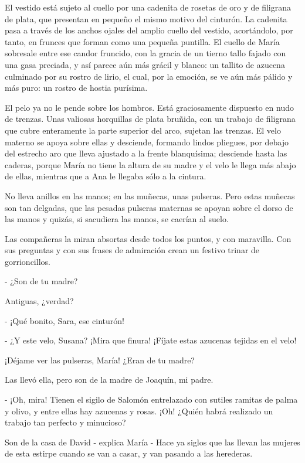 \documentclass[12pt]{book} %
\begin{document}
El vestido está sujeto al cuello por una cadenita de rosetas de oro y de filigrana de plata, que presentan en pequeño el mismo motivo del cinturón. La cadenita pasa a través de los anchos ojales del amplio cuello del vestido, acortándolo, por tanto, en frunces que forman como una pequeña puntilla. El cuello de María sobresale entre ese candor fruncido, con la gracia de un tierno tallo fajado con una gasa preciada, y así parece aún más grácil y blanco: un tallito de azucena culminado por su rostro de lirio, el cual, por la emoción, se ve aún más pálido y más puro: un rostro de hostia purísima. 

El pelo ya no le pende sobre los hombros. Está graciosamente dispuesto en nudo de trenzas. Unas valiosas horquillas de plata bruñida, con un trabajo de filigrana que cubre enteramente la parte superior del arco, sujetan las trenzas. El velo materno se apoya sobre ellas y desciende, formando lindos pliegues, por debajo del estrecho aro que lleva ajustado a la frente blanquísima; desciende hasta las caderas, porque María no tiene la altura de su madre y el velo le llega más abajo de ellas, mientras que a Ana le llegaba sólo a la cintura. 

No lleva anillos en las manos; en las muñecas, unas pulseras. Pero estas muñecas son tan delgadas, que las pesadas pulseras maternas se apoyan sobre el dorso de las manos y quizás, si sacudiera las manos, se caerían al suelo. 

Las compañeras la miran absortas desde todos los puntos, y con maravilla. Con sus preguntas y con sus frases de admiración crean un festivo trinar de gorrioncillos. 

- ¿Son de tu madre? 

Antiguas, ¿verdad? 

- ¡Qué bonito, Sara, ese cinturón! 

- ¿Y este velo, Susana? ¡Mira que finura! ¡Fíjate estas azucenas tejidas en el velo! 

¡Déjame ver las pulseras, María! ¿Eran de tu madre? 

Las llevó ella, pero son de la madre de Joaquín, mi padre. 

- ¡Oh, mira! Tienen el sigilo de Salomón entrelazado con sutiles ramitas de palma y olivo, y entre ellas hay azucenas y rosas. ¡Oh! ¿Quién habrá realizado un trabajo tan perfecto y minucioso? 

Son de la casa de David - explica María - Hace ya siglos que las llevan las mujeres de esta estirpe cuando se van a casar, y van pasando a las herederas. 
\end{document}
